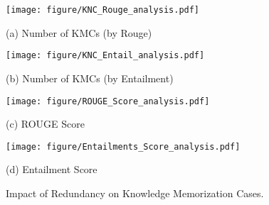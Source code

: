 \begin{figure*}[t!]
    \centering
    \begin{minipage}{0.49\textwidth}
        \centering
        \texttt{[image: figure/KNC\_Rouge\_analysis.pdf]}
        \caption*{(a) Number of KMCs (by Rouge)}
    \end{minipage}
    \hfill
    \begin{minipage}{0.49\textwidth}
        \centering
        \texttt{[image: figure/KNC\_Entail\_analysis.pdf]}
        \caption*{(b) Number of KMCs (by Entailment)}
    \end{minipage}
    
    \vspace{5mm}

    \begin{minipage}{0.49\textwidth}
        \centering
        \texttt{[image: figure/ROUGE\_Score\_analysis.pdf]}
        \caption*{(c) ROUGE Score}
    \end{minipage}
    \hfill
    \begin{minipage}{0.49\textwidth}
        \centering
        \texttt{[image: figure/Entailments\_Score\_analysis.pdf]}
        \caption*{(d) Entailment Score}
    \end{minipage}
    
    \caption{Impact of Redundancy on Knowledge Memorization Cases.}
    \label{fig:impact_redundancy}
\end{figure*}